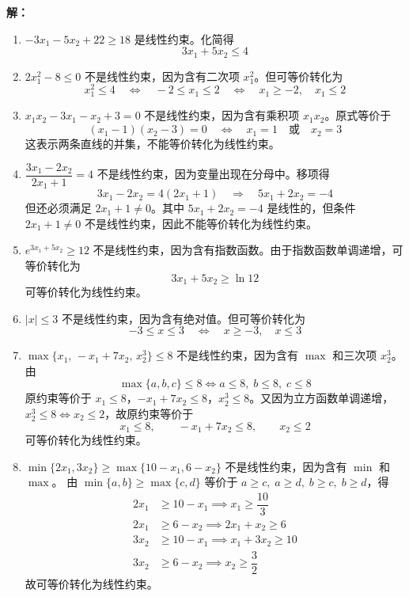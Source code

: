 \documentclass[12pt,a4paper]{article}
\begin{document}
\textbf{解：}
\begin{enumerate}

\item $-3x_1-5x_2+22\ge 18$ 是线性约束。化简得
\[
3x_1+5x_2\le 4
\]

\item $2x_1^2-8\le 0$ 不是线性约束，因为含有二次项 $x_1^2$。但可等价转化为
\[
x_1^2\le 4 \quad\Longleftrightarrow\quad -2\le x_1\le 2 \quad\Longleftrightarrow\quad x_1\ge 
-2,\quad x_1\le 2
\]

\item $x_1x_2-3x_1-x_2+3=0$ 不是线性约束，因为含有乘积项 $x_1x_2$。原式等价于
\[
(x_1-1)(x_2-3)=0 \quad\Longleftrightarrow\quad x_1=1 \quad\text{或}\quad x_2=3
\]
这表示两条直线的并集，不能等价转化为线性约束。

\item $\dfrac{3x_1-2x_2}{2x_1+1}=4$ 不是线性约束，因为变量出现在分母中。移项得
\[
3x_1-2x_2=4(2x_1+1) \quad\Longrightarrow\quad 5x_1+2x_2=-4
\]
但还必须满足 $2x_1+1\ne 0$。其中 $5x_1+2x_2=-4$ 是线性的，但条件 $2x_1+1\ne 0$ 不是线性约束，因此不能等价转化为线性约束。

\item $e^{3x_1+5x_2}\ge 12$ 不是线性约束，因为含有指数函数。由于指数函数单调递增，可等价转化为
\[
3x_1+5x_2\ge \ln 12
\]
可等价转化为线性约束。

\item $|x|\le 3$ 不是线性约束，因为含有绝对值。但可等价转化为
\[
-3\le x\le 3 \quad\Longleftrightarrow\quad x\ge -3,\quad x\le 3
\]

\item $\max\{x_1,\,-x_1+7x_2,\,x_2^3\}\le 8$ 不是线性约束，因为含有 $\max$ 和三次项 $x_2^3$。由
\[
\max\{a,b,c\}\le 8 \iff a\le 8,\; b\le 8,\; c\le 8
\]
原约束等价于 $x_1\le 8$，$-x_1+7x_2\le 8$，$x_2^3\le 8$。又因为立方函数单调递增，$x_2^3\le 8\iff x_2\le 2$，故原约束等价于
\[
x_1\le 8,\qquad -x_1+7x_2\le 8,\qquad x_2\le 2
\]
可等价转化为线性约束。

\item $\min\{2x_1,3x_2\}\ge\max\{10-x_1,6-x_2\}$ 不是线性约束，因为含有 $\min$ 和 $\max$。
由 $\min\{a,b\}\ge\max\{c,d\}$ 等价于 $a\ge c,\;a\ge d,\;b\ge c,\;b\ge d$，得
\begin{align*}
2x_1 &\ge 10-x_1 \implies x_1\ge\dfrac{10}{3}\\
2x_1 &\ge 6-x_2  \implies 2x_1+x_2\ge 6\\
3x_2 &\ge 10-x_1 \implies x_1+3x_2\ge 10\\
3x_2 &\ge 6-x_2  \implies x_2\ge\dfrac{3}{2}
\end{align*}
故可等价转化为线性约束。

\end{enumerate}
\end{document}
